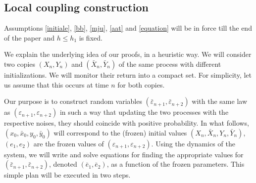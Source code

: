 \documentclass{article}
\def\mE{\mathbb{E}}
\def\mP{\mathbb{P}}
\begin{document}
%
%
%
%
%
%
%
\subsection{Local coupling construction}\label{loco}

Assumptions \ref{initiale}, \ref{bb}, \ref{mju}, \ref{aat} and \ref{equation} will 
be in force till the end of the paper and $h\leq h_{1}$ is fixed.


We explain the underlying idea of our proofs, in a heuristic way.
We will consider two copies $(X_n,Y_n)$ and $(\bar{X}_n,\bar{Y}_n)$ of the same process with
different initializations. We will monitor their return into a compact set. For simplicity, let us
assume that this occurs at time $n$ for both copies.

Our purpose is to construct random variables $(\bar{\varepsilon}_{n+1},\bar{\varepsilon}_{n+2})$
with the same law as $(\varepsilon_{n+1},\varepsilon_{n+2})$ in such a way that updating
the two processes with the respective noises, they should coincide with positive probability.
In what follows, $(x_0,\bar{x}_0,y_0,\bar{y}_0)$ will correspond to the (frozen) initial
values $(X_n,\bar{X}_n,Y_n,\bar{Y}_n)$, $(e_1,e_2)$ are the frozen values of
$(\varepsilon_{n+1},\varepsilon_{n+2})$. Using the dynamics of the system, we will write
and solve equations for finding the appropriate values for $(\bar{\varepsilon}_{n+1},\bar{\varepsilon}_{n+2})$,
denoted $(\bar{e}_1,\bar{e}_2)$, as a function of the frozen parameters. This simple plan
will be executed in two steps.
\end{document}
